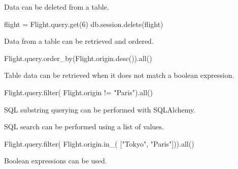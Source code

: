 \documentclass[]{book}
\newenvironment{Shaded}{\begin{snugshade}}{\end{snugshade}}
\newcommand{\StringTok}[1]{\textcolor[rgb]{0.31,0.60,0.02}{#1}}
\newcommand{\ExtensionTok}[1]{#1}
\newcommand{\NormalTok}[1]{#1}
\begin{document}
Data can be deleted from a table.

\begin{Shaded}
\begin{Highlighting}[]
\ExtensionTok{flight}\NormalTok{ = Flight.query.get(6)}
\ExtensionTok{db.session.delete}\NormalTok{(flight)}
\end{Highlighting}
\end{Shaded}

Data from a table can be retrieved and ordered.

\begin{Shaded}
\begin{Highlighting}[]
\ExtensionTok{Flight.query.order_by}\NormalTok{(Flight.origin.desc())}\ExtensionTok{.all}\NormalTok{()}
\end{Highlighting}
\end{Shaded}

Table data can be retrieved when it does not match a boolean expression.

\begin{Shaded}
\begin{Highlighting}[]
\ExtensionTok{Flight.query.filter}\NormalTok{(}
    \ExtensionTok{Flight.origin}\NormalTok{ != }\StringTok{"Paris"}\NormalTok{)}\ExtensionTok{.all}\NormalTok{()}
\end{Highlighting}
\end{Shaded}

SQL substring querying can be performed with SQLAlchemy.

\begin{Shaded}
\end{Shaded}

SQL search can be performed using a list of values.

\begin{Shaded}
\begin{Highlighting}[]
\ExtensionTok{Flight.query.filter}\NormalTok{(}
    \ExtensionTok{Flight.origin.in_}\NormalTok{(}
\NormalTok{        [}\StringTok{"Tokyo"}\NormalTok{, }\StringTok{"Paris"}\NormalTok{]))}\ExtensionTok{.all}\NormalTok{()}
\end{Highlighting}
\end{Shaded}

Boolean expressions can be used.
\end{document}
